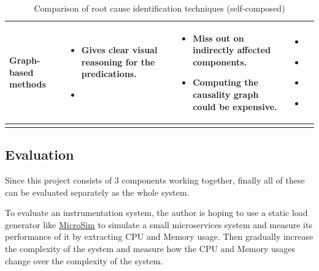 \begin{longtable}{| p{23mm} | p{40mm} | p{40mm} | p{40mm} |}
    Graph-based methods &
    \vspace{-8mm}
    \begin{itemize}[leftmargin=0mm,noitemsep,nolistsep,label={}] 
        \item Gives clear visual reasoning for the predications.
        \item  
        \vspace{-7mm}
    \end{itemize} &
    \vspace{-8mm}
    \begin{itemize}[leftmargin=0mm,noitemsep,nolistsep,label={}] 
        \item Miss out on indirectly affected components.
        \item Computing the causality graph could be expensive.
        \vspace{-7mm}
    \end{itemize} &
    \vspace{-8mm}
    \begin{itemize}[leftmargin=0mm,noitemsep,nolistsep,label={}] 
        \item \cite{samir2019dla}
        \item \cite{wu2020microrca}
        \item \cite{ma2020automap}
        \item \cite{meng2020localizing}
        \vspace{-7mm}
    \end{itemize} \\ \hline

    \caption{Comparison of root cause identification techniques (self-composed)}
\end{longtable}

\subsection{Evaluation}

Since this project consists of 3 components working together, finally all of these can be evaluated separately as the whole system.

To evaluate an instrumentation system, the author is hoping to use a static load generator like \href{https://github.com/MrSupiri/MicroSim}{MicroSim} to simulate a small microservices system and measure its performance of it by extracting CPU and Memory usage. Then gradually increase the complexity of the system and measure how the CPU and Memory usages change over the complexity of the system.

